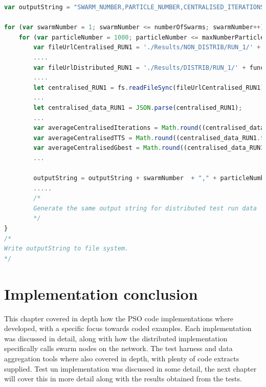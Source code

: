 \documentclass[oneside,12pt]{book}
\begin{document}
\begin{lstlisting}[basicstyle=\footnotesize, language=JavaScript]
var outputString = "SWARM_NUMBER,PARTICLE_NUMBER,CENTRALISED_ITERATIONS,CENTRALISED_TIME_TO_SOLUTION,CENTRALISED_FINAL_GROUP_BEST,DISTRIBUTED_ITERATIONS,DISTRIBUTED_TIME_TO_SOLUTION,DISTRIBUTED_FINAL_GROUP_BEST\n";

for (var swarmNumber = 1; swarmNumber <= numberOfSwarms; swarmNumber++) {
    for (var particleNumber = 1000; particleNumber <= maxNumberParticles; particleNumber += particleIncrement) {
        var fileUrlCentralised_RUN1 = './Results/NON_DISTRIB/RUN_1/' + functionName + '/' + functionName + '_' + swarmNumber + '_' + particleNumber + '.result.json';
        ....
        var fileUrlDistributed_RUN1 = './Results/DISTRIB/RUN_1/' + functionName + '/' + functionName + '_' + swarmNumber + '_' + particleNumber + '.result.json';
        ....
        let centralised_RUN1 = fs.readFileSync(fileUrlCentralised_RUN1);
        ...
        let centralised_data_RUN1 = JSON.parse(centralised_RUN1);
        ...
        var averageCentralisedIterations = Math.round((centralised_data_RUN1.iterations + centralised_data_RUN2.iterations + centralised_data_RUN3.iterations)/3);
        var averageCentralisedTTS = Math.round((centralised_data_RUN1.timeToSolution + centralised_data_RUN2.timeToSolution + centralised_data_RUN3.timeToSolution)/3);
        var averageCentralisedGbest = Math.round((centralised_data_RUN1.finalGroupBest + centralised_data_RUN2.finalGroupBest + centralised_data_RUN3.finalGroupBest)/3);
        ...

        outputString = outputString + swarmNumber  + "," + particleNumber + "," + averageCentralisedIterations + "," + averageCentralisedTTS + "," + averageCentralisedGbest + ",";
        .....
        /*
        Generate the same output string for distributed test run data
        */
}
/*
Write outputString to file system. 
*/
\end{lstlisting}
\label{listing:DataAggregation}

\section{Implementation conclusion}
This chapter covered in depth how the PSO code implementations where developed, with a specific focus towards coded examples. Each implementation was discussed in detail, along with how the distributed implementation specifically calls swarm nodes on the network. The test harness and data aggregation tools where also covered in depth, with plenty of code extracts supplied. Test un implementation was discussed in some detail, the next chapter will cover this in more detail along with the results obtained from the tests.
\end{document}
